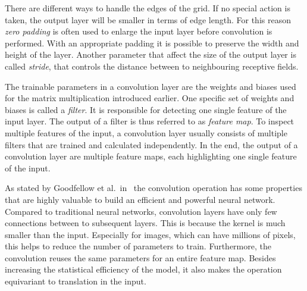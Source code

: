 There are different ways to handle the edges of the grid. If no special action is taken, the output layer will be smaller in terms of edge length. For this reason \emph{zero padding} is often used to enlarge the input layer before convolution is performed. With an appropriate padding it is possible to preserve the width and height of the layer. Another parameter that affect the size of the output layer is called \emph{stride}, that controls the distance between to neighbouring receptive fields.~\cite[p.~361]{praxiseinstieg_ml17}

The trainable parameters in a convolution layer are the weights and biases used for the matrix multiplication introduced earlier. One specific set of weights and biases is called a \emph{filter}. It is responsible for detecting one single feature of the input layer. The output of a filter is thus referred to as \emph{feature map}. To inspect multiple features of the input, a convolution layer usually consists of multiple filters that are trained and calculated independently. In the end, the output of a convolution layer are multiple feature maps, each highlighting one single feature of the input.~\cite[p.~363 f]{praxiseinstieg_ml17}

As stated by Goodfellow et al.\ in~\cite{DLbook16} the convolution operation has some properties that are highly valuable to build an efficient and powerful neural network. Compared to traditional neural networks, convolution layers have only few connections between to subsequent layers. This is because the kernel is much smaller than the input. Especially for images, which can have millions of pixels, this helps to reduce the number of parameters to train. Furthermore, the convolution reuses the same parameters for an entire feature map. Besides increasing the statistical efficiency of the model, it also makes the operation equivariant to translation in the input.


